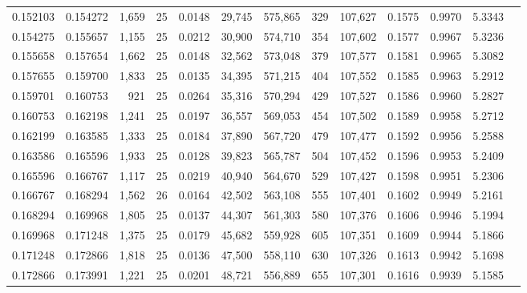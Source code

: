 \begin{tabular}{rrrrrrrrrrrrr}
0.152103 & 0.154272 & 1,659 &  25 &                                     0.0148 &  29,745 & 575,865 &     329 & 107,627 & 0.1575 & 0.9970 & 5.3343 \\
0.154275 & 0.155657 & 1,155 &  25 &                                     0.0212 &  30,900 & 574,710 &     354 & 107,602 & 0.1577 & 0.9967 & 5.3236 \\
0.155658 & 0.157654 & 1,662 &  25 &                                     0.0148 &  32,562 & 573,048 &     379 & 107,577 & 0.1581 & 0.9965 & 5.3082 \\
0.157655 & 0.159700 & 1,833 &  25 &                                     0.0135 &  34,395 & 571,215 &     404 & 107,552 & 0.1585 & 0.9963 & 5.2912 \\
0.159701 & 0.160753 &   921 &  25 &                                     0.0264 &  35,316 & 570,294 &     429 & 107,527 & 0.1586 & 0.9960 & 5.2827 \\
0.160753 & 0.162198 & 1,241 &  25 &                                     0.0197 &  36,557 & 569,053 &     454 & 107,502 & 0.1589 & 0.9958 & 5.2712 \\
0.162199 & 0.163585 & 1,333 &  25 &                                     0.0184 &  37,890 & 567,720 &     479 & 107,477 & 0.1592 & 0.9956 & 5.2588 \\
0.163586 & 0.165596 & 1,933 &  25 &                                     0.0128 &  39,823 & 565,787 &     504 & 107,452 & 0.1596 & 0.9953 & 5.2409 \\
0.165596 & 0.166767 & 1,117 &  25 &                                     0.0219 &  40,940 & 564,670 &     529 & 107,427 & 0.1598 & 0.9951 & 5.2306 \\
0.166767 & 0.168294 & 1,562 &  26 &                                     0.0164 &  42,502 & 563,108 &     555 & 107,401 & 0.1602 & 0.9949 & 5.2161 \\
0.168294 & 0.169968 & 1,805 &  25 &                                     0.0137 &  44,307 & 561,303 &     580 & 107,376 & 0.1606 & 0.9946 & 5.1994 \\
0.169968 & 0.171248 & 1,375 &  25 &                                     0.0179 &  45,682 & 559,928 &     605 & 107,351 & 0.1609 & 0.9944 & 5.1866 \\
0.171248 & 0.172866 & 1,818 &  25 &                                     0.0136 &  47,500 & 558,110 &     630 & 107,326 & 0.1613 & 0.9942 & 5.1698 \\
0.172866 & 0.173991 & 1,221 &  25 &                                     0.0201 &  48,721 & 556,889 &     655 & 107,301 & 0.1616 & 0.9939 & 5.1585 \\

\end{tabular}
